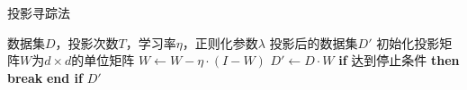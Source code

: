 \documentclass{article}
\begin{document}
	
	\begin{algorithm}
		\caption{投影寻踪法}
		\begin{algorithmic}[1]
			\Require 数据集$D$，投影次数$T$，学习率$\eta$，正则化参数$\lambda$
			\Ensure 投影后的数据集$D'$
			\State 初始化投影矩阵$W$为$d \times d$的单位矩阵
			\State $W \gets W - \eta \cdot (I - W)$
			\State $D' \gets D \cdot W$
			\State \textbf{if} {达到停止条件} \textbf{then} \textbf{break} \textbf{end if}
			\EndFor
			\State \Return $D'$
		\end{algorithmic}
	\end{algorithm}
	
\end{document}

